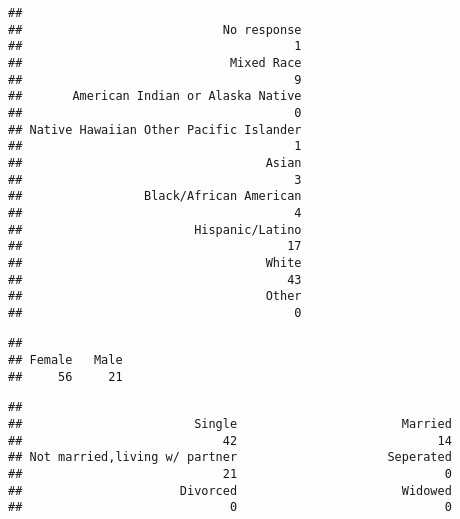 \documentclass[]{article}
\newenvironment{Shaded}{\begin{snugshade}}{\end{snugshade}}
\newcommand{\KeywordTok}[1]{\textcolor[rgb]{0.13,0.29,0.53}{\textbf{#1}}}
\newcommand{\CommentTok}[1]{\textcolor[rgb]{0.56,0.35,0.01}{\textit{#1}}}
\newcommand{\OperatorTok}[1]{\textcolor[rgb]{0.81,0.36,0.00}{\textbf{#1}}}
\newcommand{\NormalTok}[1]{#1}
\begin{document}
\begin{verbatim}
## 
##                            No response 
##                                      1 
##                             Mixed Race 
##                                      9 
##       American Indian or Alaska Native 
##                                      0 
## Native Hawaiian Other Pacific Islander 
##                                      1 
##                                  Asian 
##                                      3 
##                 Black/African American 
##                                      4 
##                        Hispanic/Latino 
##                                     17 
##                                  White 
##                                     43 
##                                  Other 
##                                      0
\end{verbatim}

\begin{Shaded}
\end{Shaded}

\begin{verbatim}
## 
## Female   Male 
##     56     21
\end{verbatim}

\begin{Shaded}
\end{Shaded}

\begin{verbatim}
## 
##                        Single                       Married 
##                            42                            14 
## Not married,living w/ partner                     Seperated 
##                            21                             0 
##                      Divorced                       Widowed 
##                             0                             0
\end{verbatim}

\begin{Shaded}
\end{Shaded}
\end{document}
